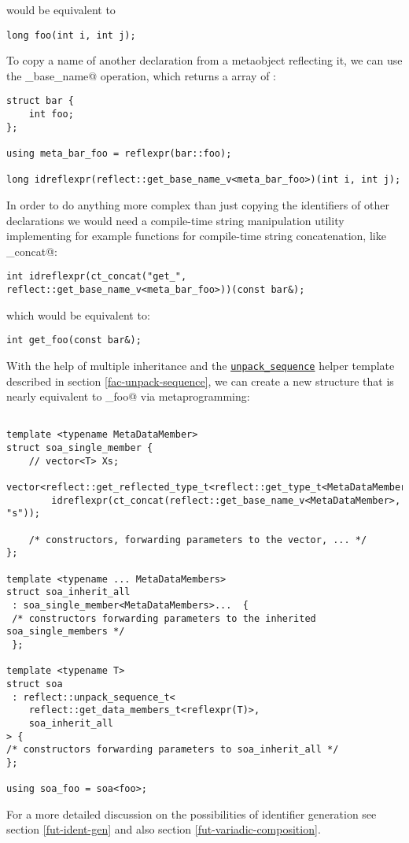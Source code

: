 would be equivalent to 

\begin{verbatim}
long foo(int i, int j);
\end{verbatim}

To copy a name of another declaration from a metaobject reflecting it,
we can use the \verb@get_base_name@ operation, which returns a \verb@constexpr@
array of \verb@char@s:

\begin{verbatim}
struct bar {
	int foo;
};

using meta_bar_foo = reflexpr(bar::foo);

long idreflexpr(reflect::get_base_name_v<meta_bar_foo>)(int i, int j);
\end{verbatim}

In order to do anything more complex than just
copying the identifiers of other declarations we would need a compile-time
string manipulation utility implementing for example functions for
compile-time string concatenation, like \verb@ct_concat@:

\begin{verbatim}
int idreflexpr(ct_concat("get_", reflect::get_base_name_v<meta_bar_foo>))(const bar&);
\end{verbatim}

which would be equivalent to:

\begin{verbatim}
int get_foo(const bar&);
\end{verbatim}

With the help of multiple inheritance and the
\hyperref[fac-unpack-sequence]{\texttt{unpack\_sequence}} helper template described
in section \ref{fac-unpack-sequence}, we can create a new structure that is
nearly equivalent to \verb@soa_foo@ via metaprogramming:

\begin{verbatim}

template <typename MetaDataMember>
struct soa_single_member {
	// vector<T> Xs;
	vector<reflect::get_reflected_type_t<reflect::get_type_t<MetaDataMember>>>
		idreflexpr(ct_concat(reflect::get_base_name_v<MetaDataMember>, "s"));

	/* constructors, forwarding parameters to the vector, ... */
};

template <typename ... MetaDataMembers>
struct soa_inherit_all
 : soa_single_member<MetaDataMembers>...  {
 /* constructors forwarding parameters to the inherited soa_single_members */
 };

template <typename T>
struct soa
 : reflect::unpack_sequence_t<
	reflect::get_data_members_t<reflexpr(T)>,
	soa_inherit_all
> {
/* constructors forwarding parameters to soa_inherit_all */
};

using soa_foo = soa<foo>;
\end{verbatim}

For a more detailed discussion on the possibilities of identifier generation
see section \ref{fut-ident-gen} and also section \ref{fut-variadic-composition}.
